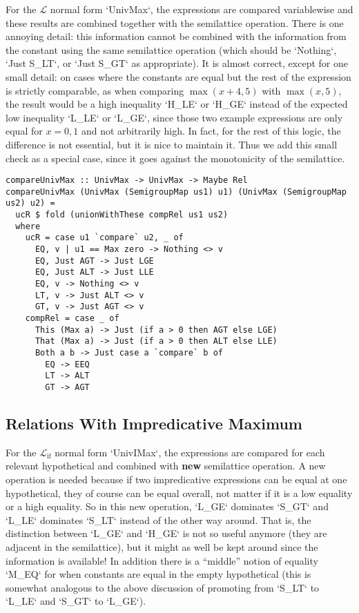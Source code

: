 \documentclass[11pt, twoside, reqno]{book}
\DeclareMathOperator{\ifop}{if}
\begin{document}

For the \(\mathcal{L}\) normal form \inHS`UnivMax`, the expressions are compared variablewise and these results are combined together with the semilattice operation.
There is one annoying detail: this information cannot be combined with the information from the constant using the same semilattice operation (which should be \inHS`Nothing`, \inHS`Just S_LT`, or \inHS`Just S_GT` as appropriate).
It is almost correct, except for one small detail: on cases where the constants are equal but the rest of the expression is strictly comparable, as when comparing \(\max(x+4, 5)\) with \(\max(x, 5)\), the result would be a high inequality \inHS`H_LE` or \inHS`H_GE` instead of the expected low inequality \inHS`L_LE` or \inHS`L_GE`, since those two example expressions are only equal for \(x = 0, 1\) and not arbitrarily high.
In fact, for the rest of this logic, the difference is not essential, but it is nice to maintain it.
Thus we add this small check as a special case, since it goes against the monotonicity of the semilattice.

\begin{verbatim}
compareUnivMax :: UnivMax -> UnivMax -> Maybe Rel
compareUnivMax (UnivMax (SemigroupMap us1) u1) (UnivMax (SemigroupMap us2) u2) =
  ucR $ fold (unionWithThese compRel us1 us2)
  where
    ucR = case u1 `compare` u2, _ of
      EQ, v | u1 == Max zero -> Nothing <> v
      EQ, Just AGT -> Just LGE
      EQ, Just ALT -> Just LLE
      EQ, v -> Nothing <> v
      LT, v -> Just ALT <> v
      GT, v -> Just AGT <> v
    compRel = case _ of
      This (Max a) -> Just (if a > 0 then AGT else LGE)
      That (Max a) -> Just (if a > 0 then ALT else LLE)
      Both a b -> Just case a `compare` b of
        EQ -> EEQ
        LT -> ALT
        GT -> AGT
\end{verbatim}

\subsection{Relations With Impredicative Maximum}

For the \(\mathcal{L}_{\ifop}\) normal form \inHS`UnivIMax`, the expressions are compared for each relevant hypothetical and combined with \textbf{new} semilattice operation.
A new operation is needed because if two impredicative expressions can be equal at one hypothetical, they of course can be equal overall, not matter if it is a low equality or a high equality.
So in this new operation, \inHS`L_GE` dominates \inHS`S_GT` and \inHS`L_LE` dominates \inHS`S_LT` instead of the other way around.
That is, the distinction between \inHS`L_GE` and \inHS`H_GE` is not so useful anymore (they are adjacent in the semilattice), but it might as well be kept around since the information is available!
In addition there is a ``middle'' notion of equality \inHS`M_EQ` for when constants are equal in the empty hypothetical (this is somewhat analogous to the above discussion of promoting from \inHS`S_LT` to \inHS`L_LE` and \inHS`S_GT` to \inHS`L_GE`).
\end{document}
